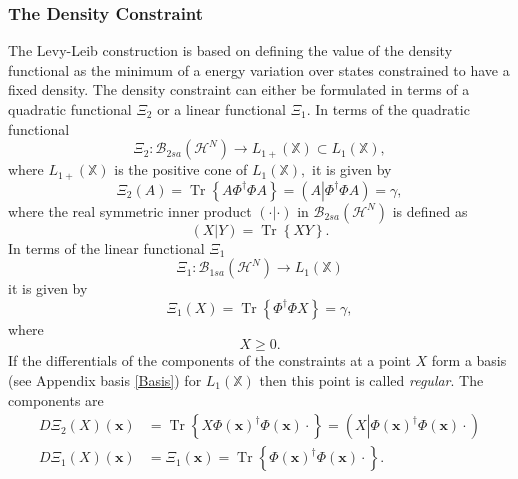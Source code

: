 \documentclass[aps,preprint]{revtex4}%
\begin{document}
\subsubsection{The Density Constraint}

The Levy-Leib construction is based on defining the value of the density
functional as the minimum of a energy variation over states constrained to
have a fixed density. The density constraint can either be formulated in terms
of a quadratic functional $\Xi_{2}$ or a linear functional $\Xi_{1}.$ In terms
of the quadratic functional
\begin{equation}
\Xi_{2}:\mathcal{B}_{2sa}\left(  \mathcal{H}^{N}\right)  \rightarrow
L_{1+}\left(  \mathbb{X}\right)  \subset L_{1}\left(  \mathbb{X}\right)  ,
\end{equation}
where $L_{1+}\left(  \mathbb{X}\right)  $ is the positive cone of
$L_{1}\left(  \mathbb{X}\right)  ,$ it is given by
\begin{equation}
\Xi_{2}\left(  A\right)  =\operatorname{Tr}\left\{  A\Phi^{\dagger}\Phi
A\right\}  =\left(  A\left\vert \Phi^{\dagger}\Phi A\right.  \right)  =\gamma,
\end{equation}
where the real symmetric inner product $\left(  \cdot\left\vert \cdot\right.
\right)  $ in $\mathcal{B}_{2sa}\left(  \mathcal{H}^{N}\right)  $ is defined
as
\begin{equation}
\left(  X\left\vert Y\right.  \right)  =\operatorname{Tr}\left\{  XY\right\}
.
\end{equation}
In terms of the linear functional $\Xi_{1}$%
\begin{equation}
\Xi_{1}:\mathcal{B}_{1sa}\left(  \mathcal{H}^{N}\right)  \rightarrow
L_{1}\left(  \mathbb{X}\right)
\end{equation}
it is given by
\begin{equation}
\Xi_{1}\left(  X\right)  =\operatorname{Tr}\left\{  \Phi^{\dagger}\Phi
X\right\}  =\gamma,
\end{equation}
where
\begin{equation}
X\geq0.
\end{equation}
If the differentials of the components of the constraints at a point $X$ form
a basis (see Appendix basis \ref{Basis}) for $L_{1}\left(  \mathbb{X}\right)
$ then this point is called \emph{regular}. The components are
\begin{align}
D\Xi_{2}\left(  X\right)  \left(  \mathbf{x}\right)   &  =\operatorname{Tr}%
\left\{  X\Phi\left(  \mathbf{x}\right)  ^{\dagger}\Phi\left(  \mathbf{x}%
\right)  \cdot\right\}  =\left(  X\left\vert \Phi\left(  \mathbf{x}\right)
^{\dagger}\Phi\left(  \mathbf{x}\right)  \right.  \cdot\right) \\
D\Xi_{1}\left(  X\right)  \left(  \mathbf{x}\right)   &  =\Xi_{1}\left(
\mathbf{x}\right)  =\operatorname{Tr}\left\{  \Phi\left(  \mathbf{x}\right)
^{\dagger}\Phi\left(  \mathbf{x}\right)  \cdot\right\}  .
\end{align}
\end{document}
